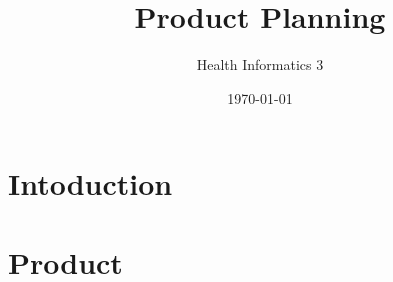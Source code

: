 \documentclass[a4paper]{article}
\title{Product Planning}
\author{Health Informatics 3}
\date{\today}
\begin{document}
\maketitle

\section{Intoduction}
\section{Product}


\end{document}

